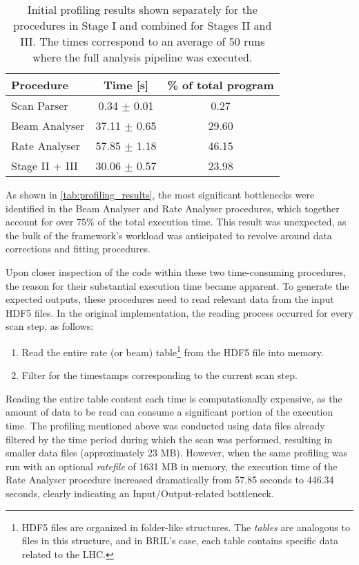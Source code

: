 \begin{table}[!htb]
	\centering
	\caption[Initial vdMFw profiling results]{Initial profiling results shown separately for the procedures in Stage I and combined for Stages II and III. The times correspond to an average of 50 runs where the full analysis pipeline was executed.}
	\begin{tabular}{|l|c|c|}
		\hline
		\textbf{Procedure} & \textbf{Time [s]} & \textbf{\% of total program} \\
		\hline
		Scan Parser        & 0.34 $\pm$ 0.01   & 0.27                         \\
		Beam Analyser      & 37.11 $\pm$ 0.65  & 29.60                        \\
		Rate Analyser      & 57.85 $\pm$ 1.18  & 46.15                        \\
		Stage II + III     & 30.06 $\pm$ 0.57  & 23.98                        \\
		\hline
	\end{tabular}
	\label{tab:profiling_results}
\end{table}

As shown in \autoref{tab:profiling_results}, the most significant bottlenecks were identified in the Beam Analyser and Rate Analyser procedures, which together account for over 75\% of the total execution time. This result was unexpected, as the bulk of the framework’s workload was anticipated to revolve around data corrections and fitting procedures.

Upon closer inspection of the code within these two time-consuming procedures, the reason for their substantial execution time became apparent. To generate the expected outputs, these procedures need to read relevant data from the input HDF5 files. In the original implementation, the reading process occurred for every scan step, as follows:

\begin{enumerate}
	\item Read the entire rate (or beam) table\footnote{HDF5 files are organized in folder-like structures. The \textit{tables} are analogous to files in this structure, and in BRIL's case, each table contains specific data related to the LHC.} from the HDF5 file into memory.
	\item Filter for the timestamps corresponding to the current scan step.
\end{enumerate}

Reading the entire table content each time is computationally expensive, as the amount of data to be read can consume a significant portion of the execution time. The profiling mentioned above was conducted using data files already filtered by the time period during which the scan was performed, resulting in smaller data files (approximately 23 MB). However, when the same profiling was run with an optional \textit{ratefile} of 1631 MB in memory, the execution time of the Rate Analyser procedure increased dramatically from 57.85 seconds to 446.34 seconds, clearly indicating an Input/Output-related bottleneck.

